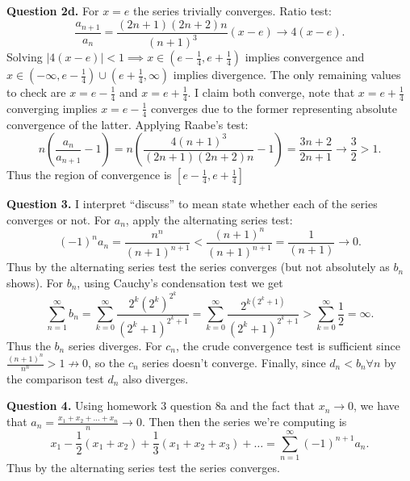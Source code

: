 \documentclass[letterpaper, reqno,11pt]{article}
\begin{document}
{\medskip\noindent\bf Question 2d.} For $x=e$ the series trivially converges. Ratio test:
\[
\frac{a_{n+1}}{a_n}=\frac{(2n+1)(2n+2)n}{(n+1)^3}(x-e)\to 4(x-e)
.\]
Solving $|4(x-e)|<1\implies x\in (e-\frac{1}{4},e+\frac{1}{4})$ implies convergence and $x\in(-\infty,e-\frac{1}{4})\cup(e+\frac{1}{4},\infty)$ implies divergence. The only remaining values to check are $x=e-\frac{1}{4}$ and $x=e+\frac{1}{4}$. I claim both converge, note that $x=e+\frac{1}{4}$ converging implies $x=e-\frac{1}{4}$ converges due to the former representing absolute convergence of the latter. Applying Raabe's test:
\[
    n\left( \frac{a_{n}}{a_{n+1}}-1 \right) =n\left( \frac{4(n+1)^3}{(2n+1)(2n+2)n}-1 \right)=\frac{3n+2}{2n+1}\to \frac{3}{2}>1
.\]
Thus the region of convergence is $[e-\frac{1}{4},e+\frac{1}{4}]$


\newpage\phantom{blabla}
\newpage

{\medskip\noindent\bf Question 3.} I interpret ``discuss'' to mean state whether each of the series converges or not. For $a_n$, apply the alternating series test:
\[
(-1)^{n}a_n= \frac{n^{n}}{(n+1)^{n+1}}<\frac{(n+1)^{n}}{(n+1)^{n+1}}=\frac{1}{(n+1)}\to 0
.\]
Thus by the alternating series test the series converges (but not absolutely as $b_n$ shows). For $b_n$, using Cauchy's condensation test we get
\[
\sum_{n=1}^{\infty}b_n=\sum_{k=0}^{\infty}\frac{2^{k}(2^{k})^{2^{k}}}{(2^{k}+1)^{2^{k}+1}}=\sum_{k=0}^{\infty}\frac{2^{k(2^{k}+1)}}{(2^{k}+1)^{2^{k}+1}}>\sum_{k=0}^{\infty}\frac{1}{2}=\infty
.\]
Thus the $b_n$ series diverges. For $c_n$, the crude convergence test is sufficient since $\frac{(n+1)^{n}}{n^{n}}>1\not\to 0$, so the $c_n$ series doesn't converge. Finally, since $d_n<b_n\forall n$ by the comparison test $d_n$ also diverges.

\newpage\phantom{blabla}
\newpage

{\medskip\noindent\bf Question 4.} Using homework 3 question 8a and the fact that $x_n\to 0$, we have that $a_n=\frac{x_1+x_2+\ldots+x_n}{n}\to 0$. Then then the series we're computing is
\[
x_1-\frac{1}{2}(x_1+x_2)+\frac{1}{3}(x_1+x_2+x_3)+\ldots=\sum_{n=1}^{\infty}(-1)^{n+1}a_n
.\]
Thus by the alternating series test the series converges.


\end{document}
